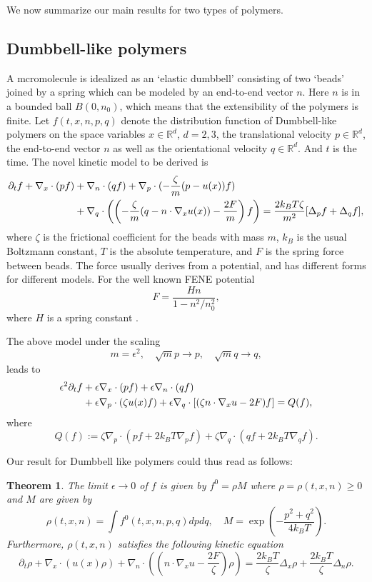 \documentclass[reqno]{amsart}
\numberwithin{equation}{section}
\newtheorem{Theorem}{Theorem}[section]
\theoremstyle{definition}
\theoremstyle{remark}
\begin{document}
We now summarize our main results for two types of polymers.
\subsection{Dumbbell-like polymers} A mcromolecule is idealized as an
`elastic dumbbell' consisting of two `beads' joined by a spring
which can be modeled by an end-to-end vector $n$. Here $n$ is in a
bounded ball $B(0, n_0)$, which means that the extensibility of the
polymers is finite. Let $f(t, x, n, p, q)$ denote the distribution
function of Dumbbell-like polymers on the space variables $x\in
\mathbb{R}^d$, $d=2, 3$, the translational velocity $p\in
\mathbb{R}^d$, the end-to-end vector $n$ as well as the
orientational velocity $q \in \mathbb{R}^d$. And $t$ is the time.
The novel kinetic model to be derived is
\begin{align}\label{fp2-}
\partial_t f +\nabla_x\cdot (pf) &+\nabla_n\cdot(qf)
+\nabla_p\cdot(-\frac{\zeta}{m}(p-u(x))f)\\ \notag
&+\nabla_q\cdot\left(\left(-\frac{\zeta}{m}(q-n\cdot \nabla_x u(x))
-\frac{2F}{m}\right)f\right)=\frac{2k_BT\zeta}{m^2}[\Delta_p f
+\Delta_q f],
\end{align}
where $\zeta$ is the frictional coefficient for the beads with mass
$m$, $k_B$ is the usual Boltzmann constant,  $T$ is the absolute
temperature, and $F$ is the spring force between beads. The force
usually derives from a potential, and has different forms for
different models. For the well known  FENE potential
$$
F=\frac{Hn}{1-n^2/n^2_0},
$$
where $H$ is a spring constant \cite{BCAH:1987}.

The above model under the scaling
$$ m=\epsilon^2, \quad \sqrt{m}p
\to p, \quad \sqrt{m}q \to q,
$$
leads to
\begin{align} \label{fe-}
\epsilon^2 \partial_t f & +\epsilon \nabla_x\cdot(pf)  + \epsilon
\nabla_n\cdot(qf) \notag \\
\quad & +\epsilon \nabla_p \cdot (\zeta u(x)f)+\epsilon
\nabla_q\cdot[(\zeta n\cdot \nabla_x u -2F)f]=Q(f),
\end{align}
where
$$
Q(f):=\zeta \nabla_p \cdot(pf +2k_BT \nabla_p f)+\zeta \nabla_q
\cdot(qf +2k_BT \nabla_q f).
$$

Our result for Dumbbell like polymers could thus read as follows:
\begin{Theorem}The limit $\epsilon\to 0$ of $f$ is given by $f^0=\rho M$
where $\rho=\rho(t, x, n) \geq 0$  and $M$ are given by
$$
\rho(t, x, n)=\int f^0(t, x, n, p, q)dpdq, \quad
M=\exp\left(-\frac{p^2+q^2}{4k_BT}\right).
$$
Furthermore, $\rho(t, x, n)$ satisfies the following kinetic
equation
\begin{equation}\label{fp1-}
    \partial_t \rho + \nabla_x\cdot(u(x)\rho) +\nabla_n \cdot ((n\cdot \nabla_x u-\frac{2F}{\zeta})\rho)=
\frac{2k_BT}{\zeta}\Delta_x \rho +\frac{2k_BT}{\zeta}\Delta_n \rho.
\end{equation}
\end{Theorem}
\end{document}
